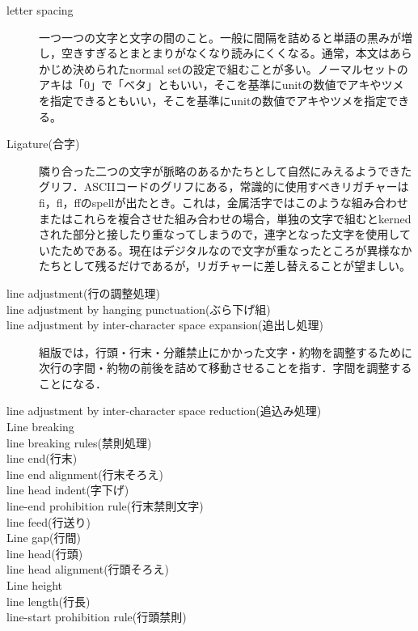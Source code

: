 \begin{description}
    \item[letter spacing]一つ一つの文字と文字の間のこと。一般に間隔を詰めると単語の黒みが増し，空きすぎるとまとまりがなくなり読みにくくなる。通常，本文はあらかじめ決められたnormal setの設定で組むことが多い。ノーマルセットのアキは「0」で「ベタ」ともいい，そこを基準にunitの数値でアキやツメを指定できるともいい，そこを基準にunitの数値でアキやツメを指定できる\cite{handbook_of_typography}。
    \item[Ligature(合字)]隣り合った二つの文字が脈略のあるかたちとして自然にみえるようできたグリフ．ASCIIコードのグリフにある，常識的に使用すべきリガチャーはfi，fl，ffのspellが出たとき。これは，金属活字ではこのような組み合わせまたはこれらを複合させた組み合わせの場合，単独の文字で組むとkernedされた部分と接したり重なってしまうので，連字となった文字を使用していたためである。現在はデジタルなので文字が重なったところが異様なかたちとして残るだけであるが，リガチャーに差し替えることが望ましい\cite{handbook_of_typography}。
    \item[line adjustment(行の調整処理)]
    \item[line adjustment by hanging punctuation(ぶら下げ組)]
    \item[line adjustment by inter-character space expansion(追出し処理)] 組版では，行頭・行末・分離禁止にかかった文字・約物を調整するために次行の字間・約物の前後を詰めて移動させることを指す．字間を調整することになる\cite{www.jpp.co.jp:yougo/a1.html}．
    \item[line adjustment by inter-character space reduction(追込み処理)]
    \item[Line breaking]
    \item[line breaking rules(禁則処理)]
    \item[line end(行末)]
    \item[line end alignment(行末そろえ)]
    \item[line head indent(字下げ)]
    \item[line-end prohibition rule(行末禁則文字)]
    \item[line feed(行送り)]
    \item[Line gap(行間)]
    \item[line head(行頭)]
    \item[line head alignment(行頭そろえ)]
    \item[Line height]
    \item[line length(行長)]
    \item[line-start prohibition rule(行頭禁則)]

\end{description}
